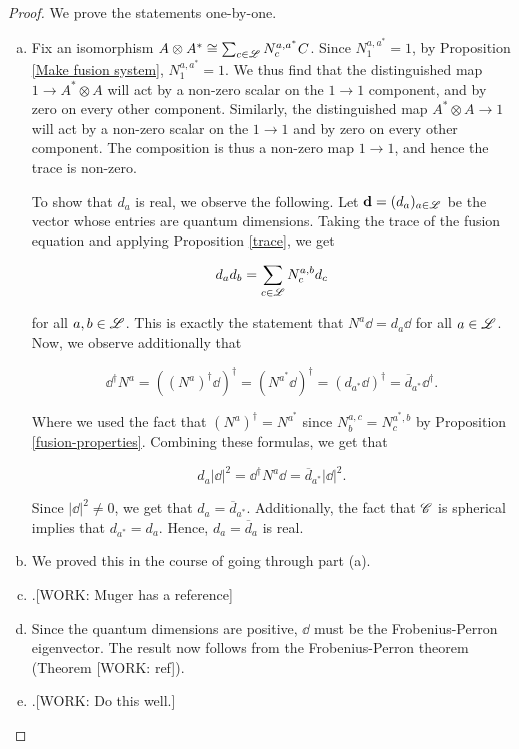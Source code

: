 \documentclass{article}
\theoremstyle{definition}
\numberwithin{figure}{section}
\begin{document}
\begin{proof} We prove the statements one-by-one.

\begin{enumerate}[(a)]
\item Fix an isomorphism $A\otimes A^*\cong \sum_{c\in\mathscr{L}}N^{a,a^*}_{c}C$. Since $N^{a,a^*}_1=1$, by Proposition \ref{Make fusion system}, $N^{a,a^*}_1=1$. We thus find that the distinguished map $ 1\to A^*\otimes A$ will act by a non-zero scalar on the $1\to1$ component, and by zero on every other component. Similarly, the distinguished map $A^*\otimes A\to 1$ will act by a non-zero scalar on the $1\to 1$ and by zero on every other component. The composition is thus a non-zero map $1\to 1$, and hence the trace is non-zero.

To show that $d_a$ is real, we observe the following. Let $\bold{d}=(d_a)_{a\in\mathscr{L}}$ be the vector whose entries are quantum dimensions. Taking the trace of the fusion equation and applying Proposition \ref{trace}, we get

$$d_ad_b=\sum_{c\in\mathscr{L}}N^{a,b}_c d_c$$

for all $a,b\in\mathscr{L}$. This is exactly the statement that $N^a \dd =d_a \dd$ for all $a\in\mathscr{L}$. Now, we observe additionally that 

$$\dd^{\dagger}N^a=\left(\left(N^a\right)^\dagger \dd\right)^\dagger=\left(N^{a^*}\dd\right)^{\dagger}=\left(d_{a^*}\dd\right)^{\dagger}=\overline{d}_{a^*}\dd^{\dagger}.$$

Where we used the fact that $(N^{a})^{\dagger}=N^{a^*}$ since $N^{a,c}_{b}=N^{a^*,b}_c$ by Proposition \ref{fusion-properties}. Combining these formulas, we get that

$$d_a |\dd|^2=\dd^{\dagger}N^a\dd=\overline{d}_{a^*}|\dd|^2.$$

Since $|\dd|^2\neq 0$, we get that $d_a=\overline{d}_{a^*}$. Additionally, the fact that $\mathscr{C}$ is spherical implies that $d_{a^*}=d_a$. Hence, $d_a=\overline{d}_a$ is real. 

\item We proved this in the course of going through part (a).

\item .[WORK: Muger has a reference]

\item Since the quantum dimensions are positive, $\dd$ must be the Frobenius-Perron eigenvector. The result now follows from the Frobenius-Perron theorem (Theorem [WORK: ref]).

\item .[WORK: Do this well.]
\end{enumerate}
\end{proof}
\end{document}
